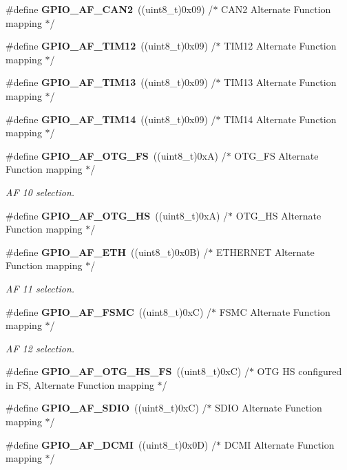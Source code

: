 \begin{DoxyCompactItemize}
\#define \textbf{ G\+P\+I\+O\+\_\+\+A\+F\+\_\+\+C\+A\+N2}~((uint8\+\_\+t)0x09)  /$\ast$ C\+A\+N2 Alternate Function mapping $\ast$/
\item 
\#define \textbf{ G\+P\+I\+O\+\_\+\+A\+F\+\_\+\+T\+I\+M12}~((uint8\+\_\+t)0x09)  /$\ast$ T\+I\+M12 Alternate Function mapping $\ast$/
\item 
\#define \textbf{ G\+P\+I\+O\+\_\+\+A\+F\+\_\+\+T\+I\+M13}~((uint8\+\_\+t)0x09)  /$\ast$ T\+I\+M13 Alternate Function mapping $\ast$/
\item 
\#define \textbf{ G\+P\+I\+O\+\_\+\+A\+F\+\_\+\+T\+I\+M14}~((uint8\+\_\+t)0x09)  /$\ast$ T\+I\+M14 Alternate Function mapping $\ast$/
\item 
\#define \textbf{ G\+P\+I\+O\+\_\+\+A\+F\+\_\+\+O\+T\+G\+\_\+\+FS}~((uint8\+\_\+t)0x\+A)  /$\ast$ O\+T\+G\+\_\+\+F\+S Alternate Function mapping $\ast$/
\begin{DoxyCompactList}\small\item\em AF 10 selection. \end{DoxyCompactList}\item 
\#define \textbf{ G\+P\+I\+O\+\_\+\+A\+F\+\_\+\+O\+T\+G\+\_\+\+HS}~((uint8\+\_\+t)0x\+A)  /$\ast$ O\+T\+G\+\_\+\+H\+S Alternate Function mapping $\ast$/
\item 
\#define \textbf{ G\+P\+I\+O\+\_\+\+A\+F\+\_\+\+E\+TH}~((uint8\+\_\+t)0x0\+B)  /$\ast$ E\+T\+H\+E\+R\+N\+E\+T Alternate Function mapping $\ast$/
\begin{DoxyCompactList}\small\item\em AF 11 selection. \end{DoxyCompactList}\item 
\#define \textbf{ G\+P\+I\+O\+\_\+\+A\+F\+\_\+\+F\+S\+MC}~((uint8\+\_\+t)0x\+C)  /$\ast$ F\+S\+M\+C Alternate Function mapping $\ast$/
\begin{DoxyCompactList}\small\item\em AF 12 selection. \end{DoxyCompactList}\item 
\#define \textbf{ G\+P\+I\+O\+\_\+\+A\+F\+\_\+\+O\+T\+G\+\_\+\+H\+S\+\_\+\+FS}~((uint8\+\_\+t)0x\+C)  /$\ast$ O\+T\+G H\+S configured in F\+S, Alternate Function mapping $\ast$/
\item 
\#define \textbf{ G\+P\+I\+O\+\_\+\+A\+F\+\_\+\+S\+D\+IO}~((uint8\+\_\+t)0x\+C)  /$\ast$ S\+D\+I\+O Alternate Function mapping $\ast$/
\item 
\#define \textbf{ G\+P\+I\+O\+\_\+\+A\+F\+\_\+\+D\+C\+MI}~((uint8\+\_\+t)0x0\+D)  /$\ast$ D\+C\+M\+I Alternate Function mapping $\ast$/

\end{DoxyCompactItemize}

